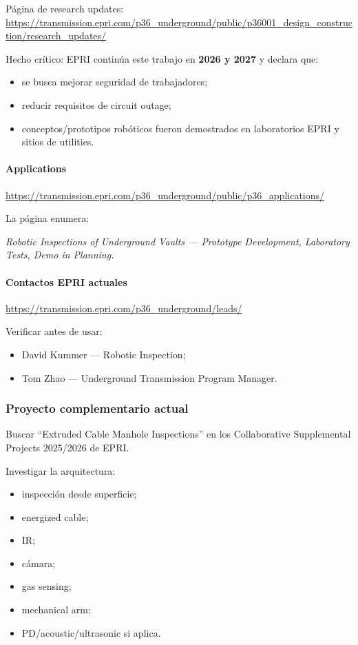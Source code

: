 \documentclass[11pt,a4paper]{article}
\newenvironment{callout}
  {\par\medskip\noindent
   \begin{lrbox}{\calloutbox}%
   \begin{minipage}{\dimexpr\linewidth-2.2em\relax}\itshape}
  {\end{minipage}\end{lrbox}%
   \noindent{\color{accent}\vrule width 2.5pt}\hspace{0.6em}%
   \colorbox{calloutbg}{\usebox{\calloutbox}}\par\medskip}
\begin{document}
Página de research updates:
\url{https://transmission.epri.com/p36_underground/public/p36001_design_construction/research_updates/}

Hecho crítico:
EPRI continúa este trabajo en \textbf{2026 y 2027} y declara que:

\begin{itemize}
\item se busca mejorar seguridad de trabajadores;
\item reducir requisitos de circuit outage;
\item conceptos/prototipos robóticos fueron demostrados en laboratorios EPRI y sitios de utilities.
\end{itemize}


\paragraph*{Applications}
\url{https://transmission.epri.com/p36_underground/public/p36_applications/}

La página enumera:

\begin{callout}
Robotic Inspections of Underground Vaults — Prototype Development, Laboratory Tests, Demo in Planning.
\end{callout}


\paragraph*{Contactos EPRI actuales}
\url{https://transmission.epri.com/p36_underground/leads/}

Verificar antes de usar:

\begin{itemize}
\item David Kummer — Robotic Inspection;
\item Tom Zhao — Underground Transmission Program Manager.
\end{itemize}


\subsubsection*{Proyecto complementario actual}
Buscar ``Extruded Cable Manhole Inspections'' en los Collaborative Supplemental Projects 2025/2026 de EPRI.

Investigar la arquitectura:

\begin{itemize}
\item inspección desde superficie;
\item energized cable;
\item IR;
\item cámara;
\item gas sensing;
\item mechanical arm;
\item PD/acoustic/ultrasonic si aplica.
\end{itemize}
\end{document}
